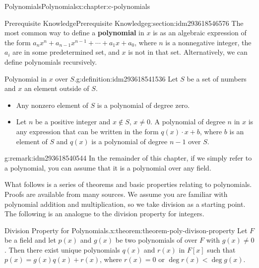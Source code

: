 \documentclass[twoside,10pt,]{book}
\newcommand{\terminology}[1]{\textbf{#1}}
\numberwithin{equation}{section}
\begin{document}
%
%
\typeout{************************************************}
\typeout{************************************************}
%
\begin{chapterptx}{Polynomials}{}{Polynomials}{}{}{x:chapter:c-polynomials}
%
%
\typeout{************************************************}
\typeout{************************************************}
%
\begin{sectionptx}{Prerequisite Knowledge}{}{Prerequisite Knowledge}{}{}{g:section:idm293618546576}
The most common way to define a \terminology{polynomial} in \(x\) is as an algebraic expression of the form \(a_n x^n + a_{n-1}x^{n-1}+ \cdots +a_1 x + a_0\), where \(n\) is a nonnegative integer, the \(a_i\) are in some predetermined set, and \(x\) is not in that set.  Alternatively, we can define polynomials recursively.%
\begin{definition}{Polynomial in \(x\) over \(S\).}{g:definition:idm293618541536}%
%
Let \(S\) be a set of numbers and \(x\) an element outside of \(S\).%
\begin{itemize}[label=\textbullet]
\item{}Any nonzero element of \(S\) is a polynomial of degree zero.%
\item{}Let \(n\) be a positive integer and \(x \notin S\), \(x \neq 0\).  A polynomial of degree \(n\) in \(x\) is any expression that can be written in the form \(q(x)\cdot x + b\), where \(b\) is an element of \(S\) and \(q(x)\) is a polynomial of degree \(n-1\) over \(S\).%
\end{itemize}
%
\end{definition}
\begin{remark}{}{g:remark:idm293618540544}%
In the remainder of this chapter, if we simply refer to a polynomial, you can assume that it is a polynomial over any field.%
\end{remark}
What follows is a series of theorems and basic properties relating to polynomials.  Proofs are available from many sources.  We assume you are familiar with polynomial addition and multiplication, so we take division as a starting point.  The following is an analogue to the division property for integers.%
\begin{theorem}{Division Property for Polynomials.}{}{x:theorem:theorem-poly-divison-property}%
%
Let \(F\) be a field and let \(p(x)\) and \(g(x)\) be two polynomials of over \(F\) with \(g(x) \neq  0\). Then there exist unique polynomials \(q(x)\) and \(r(x)\) in \(F[x]\) such that \(p(x) = g(x) q(x) + r(x)\), where \(r(x) = 0\) or \(\deg  r(x) < \deg  g(x)\).%

\end{theorem}
\end{sectionptx}
\end{chapterptx}
\end{document}
